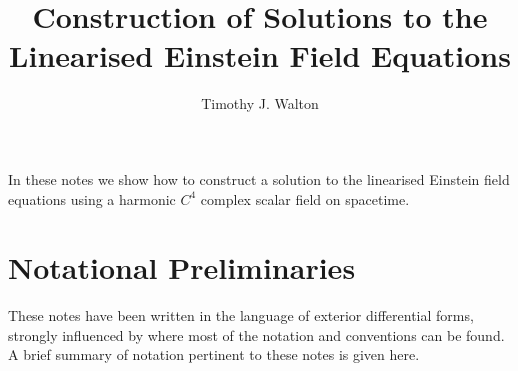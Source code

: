 \documentclass[10pt,a4paper]{article}
\renewenvironment{abstract}{\small	\begin{center}
										\bfseries \vspace{-.5em}\vspace{0pt}
									\end{center}
									\quote
									}
									{\endquote}
\begin{document}
\title{\bf Construction of Solutions to the Linearised Einstein Field Equations}
\author{Timothy J. Walton}
\date{}
\maketitle
\begin{abstract}
	In these notes we show how to construct a solution to the linearised Einstein field equations using a harmonic $C^{4}$ complex scalar field on spacetime.
\end{abstract}
\tableofcontents
\newpage

\section{Notational Preliminaries}\label{sect:notation}
These notes have been written in the language of exterior differential forms, strongly influenced by \cite{BennTucker} where  most of the notation and conventions can be found. A brief summary of notation pertinent to these notes is given here. \\[0.2cm]
\end{document}

